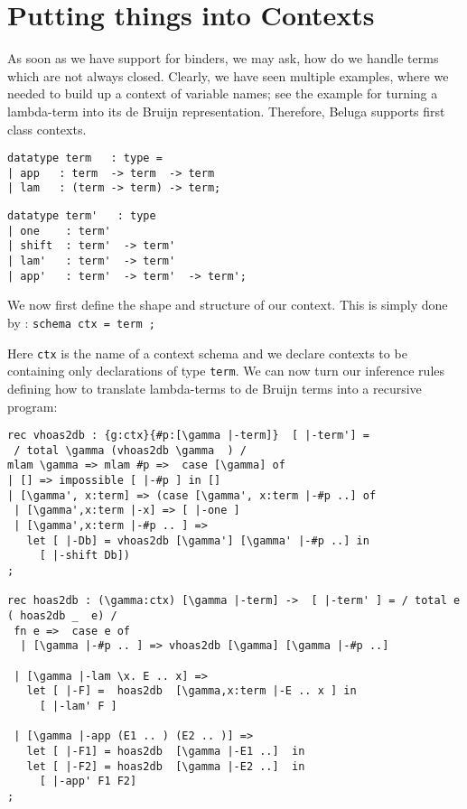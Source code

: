 \section*{Putting things into Contexts} As soon as we have support for binders,
we may ask, how do we handle terms which are not always
closed. Clearly, we have seen multiple examples, where we needed to
build up a context of variable names; see the example for turning a
lambda-term into its de Bruijn representation.
%
Therefore, Beluga supports first class contexts.

\begin{minipage}[t]{7cm}
\begin{lstlisting}
datatype term   : type =
| app   : term  -> term  -> term
| lam   : (term -> term) -> term;
  \end{lstlisting}
\end{minipage}
\begin{minipage}[t]{7cm}
\begin{lstlisting}
datatype term'   : type
| one    : term'
| shift  : term'  -> term'
| lam'   : term'  -> term'
| app'   : term'  -> term'  -> term';
\end{lstlisting}
\end{minipage}

We now first define the shape and structure of our context. This is
simply done by : \lstinline!schema ctx = term ; !


Here \lstinline!ctx! is the name of a context schema and we declare
contexts to be containing only declarations of type \lstinline!term!.
We can now turn our inference rules defining how to translate
lambda-terms to de Bruijn terms into a recursive program:


\begin{lstlisting}
rec vhoas2db : {g:ctx}{#p:[\gamma |-term]}  [ |-term'] =
 / total \gamma (vhoas2db \gamma  ) /
mlam \gamma => mlam #p =>  case [\gamma] of
| [] => impossible [ |-#p ] in []
| [\gamma', x:term] => (case [\gamma', x:term |-#p ..] of
 | [\gamma',x:term |-x] => [ |-one ]
 | [\gamma',x:term |-#p .. ] =>
   let [ |-Db] = vhoas2db [\gamma'] [\gamma' |-#p ..] in
     [ |-shift Db])
;

rec hoas2db : (\gamma:ctx) [\gamma |-term] ->  [ |-term' ] = / total e ( hoas2db _  e) /
 fn e =>  case e of
  | [\gamma |-#p .. ] => vhoas2db [\gamma] [\gamma |-#p ..]

 | [\gamma |-lam \x. E .. x] =>
   let [ |-F] =  hoas2db  [\gamma,x:term |-E .. x ] in
     [ |-lam' F ]

 | [\gamma |-app (E1 .. ) (E2 .. )] =>
   let [ |-F1] = hoas2db  [\gamma |-E1 ..]  in
   let [ |-F2] = hoas2db  [\gamma |-E2 ..]  in
     [ |-app' F1 F2]
;
\end{lstlisting}


